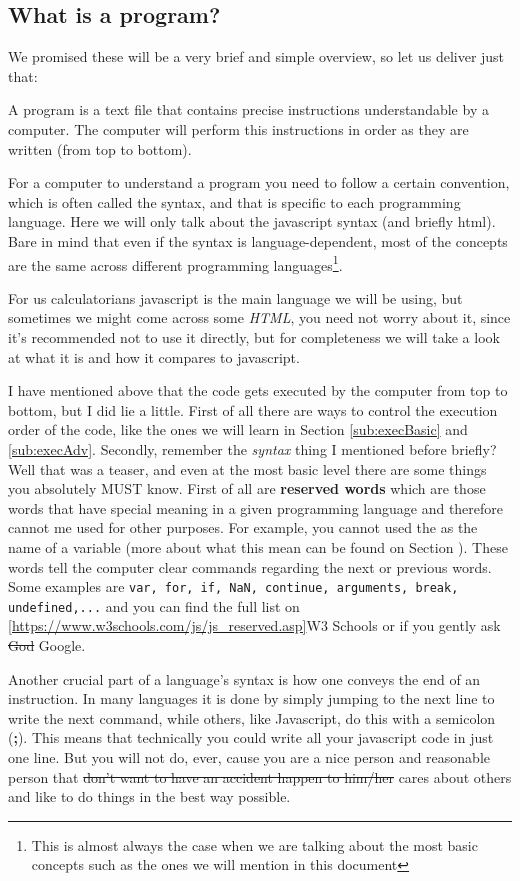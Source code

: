 \subsection{What is a program?} 
\label{sub:program}
We promised these will be a very brief and simple overview, so let us deliver just that:

A program is a text file that contains precise instructions understandable by a computer. The computer will perform this instructions in order as they are written (from top to bottom). 

For a computer to understand a program you need to follow a certain convention, which is often called the syntax, and that is specific to each programming language. Here we will only talk about the javascript syntax (and briefly html). Bare in mind that even if the syntax is language-dependent, most of the concepts are the same across different programming languages\footnote{This is almost always the case when we are talking about the most basic concepts such as the ones we will mention in this document}.

For us calculatorians javascript is the main language we will be using, but sometimes we might come across some \textit{HTML}, you need not worry about it, since it's recommended not to use it directly, but for completeness we will take a look at what it is and how it compares to javascript.

I have mentioned above that the code gets executed by the computer from top to bottom, but I did lie a little. First of all there are ways to control the execution order of the code, like the ones we will learn in Section \ref{sub:execBasic} and \ref{sub:execAdv}. Secondly, remember the \textit{syntax} thing I mentioned before briefly? Well that was a teaser, and even at the most basic level there are some things you absolutely MUST know. First of all are \textbf{reserved words} which are those words that have special meaning in a given programming language and therefore cannot me used for other purposes. For example, you cannot used the as the name of a variable (more about what this mean can be found on Section ). These words tell the computer clear commands regarding the next or previous words. Some examples are \texttt{var, for, if, NaN, continue, arguments, break, undefined,...} and you can find the full list on \ref{https://www.w3schools.com/js/js_reserved.asp}{W3 Schools} or if you gently ask \sout{God} Google.

Another crucial part of a language's syntax is how one conveys the end of an instruction. In many languages it is done by simply jumping to the next line to write the next command, while others, like Javascript, do this with a semicolon (\textbf{;}). This means that technically you could write all your javascript code in just one line. But you will not do, ever, cause you are a nice person and reasonable person that \sout{don't want to have an accident happen to him/her} cares about others and like to do things in the best way possible.

